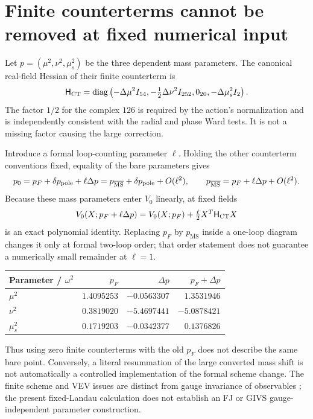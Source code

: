 \documentclass[11pt]{article}
\newcommand{\diag}{\operatorname{diag}}
\newcommand{\MS}{\overline{\mathrm{MS}}}
\begin{document}
\section{Finite counterterms cannot be removed at fixed numerical input}
Let $p=(\mu^2,\nu^2,\mu_s^2)$ be the three dependent mass parameters.
The canonical real-field Hessian of their finite counterterm is
\begin{equation}
 \mathsf H_{\rm CT}=\diag\left(-\Delta\mu^2 I_{54},
 -\tfrac12\Delta\nu^2 I_{252},0_{20},-\Delta\mu_s^2 I_2\right).
 \label{eq:massCT}
\end{equation}
The factor $1/2$ for the complex $126$ is required by the action's
normalization and is independently consistent with the radial and phase
Ward tests. It is not a missing factor causing the large correction.

Introduce a formal loop-counting parameter $\ell$. Holding the other
counterterm conventions fixed, equality of the bare parameters gives
\begin{equation}
 p_0=p_F+\delta p_{\rm pole}+\ell\Delta p
     =p_{\MS}+\delta p_{\rm pole}+O(\ell^2),\qquad
 p_{\MS}=p_F+\ell\Delta p+O(\ell^2).
 \label{eq:scheme}
\end{equation}
Because these mass parameters enter $V_0$ linearly, at fixed fields
\begin{equation}
 V_0(X;p_F+\ell\Delta p)
 =V_0(X;p_F)+\tfrac\ell2 X^T\mathsf H_{\rm CT}X
 \label{eq:exactmass}
\end{equation}
is an exact polynomial identity. Replacing $p_F$ by $p_{\MS}$ inside a
one-loop diagram changes it only at formal two-loop order; that order
statement does not guarantee a numerically small remainder at $\ell=1$.

\begin{center}
\begin{tabular}{lrrr}
\toprule
Parameter / $\omega^2$ & $p_F$ & $\Delta p$ & $p_F+\Delta p$\\
\midrule
$\mu^2$ & $1.4095253$ & $-0.0563307$ & $1.3531946$\\
$\nu^2$ & $0.3819020$ & $-5.4697441$ & $-5.0878421$\\
$\mu_s^2$ & $0.1719203$ & $-0.0342377$ & $0.1376826$\\
\bottomrule
\end{tabular}
\end{center}
Thus using zero finite counterterms with the old $p_F$ does not describe
the same bare point. Conversely, a literal resummation of the large
converted mass shift is not automatically a controlled implementation
of the formal scheme change. The finite scheme and VEV issues are
distinct from gauge invariance of observables \cite{vev}; the present
fixed-Landau calculation does not establish an FJ or GIVS gauge-independent
parameter construction.
\end{document}
